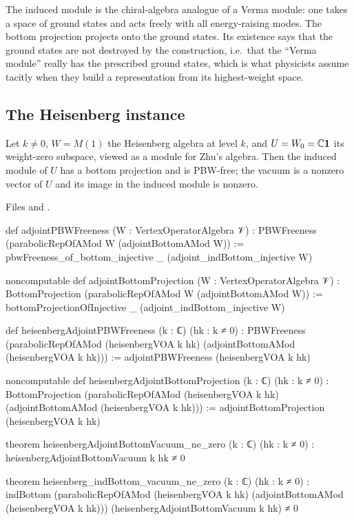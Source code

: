 \begin{physics}
The induced module is the chiral-algebra analogue of a Verma module: one takes a space of ground states and
acts freely with all energy-raising modes. The bottom projection projects onto the ground states.
Its existence says that the ground states are not destroyed by the construction, i.e.\ that the ``Verma
module'' really has the prescribed ground states, which is what physicists assume tacitly when they build a
representation from its highest-weight space.
\end{physics}

\subsection{The Heisenberg instance}

\begin{theorem}\label{l05:thm:pbw}
Let $k\ne0$, $W=M(1)$ the Heisenberg algebra at level $k$, and $U=W_0={\mathbb{C}}\mathbf{1}$ its weight-zero subspace,
viewed as a module for Zhu's algebra. Then the induced module of $U$ has a bottom projection and is PBW-free;
the vacuum is a nonzero vector of $U$ and its image in the induced module is nonzero.
\end{theorem}

\noindent Files  and
.
\begin{leancode}
def adjointPBWFreeness (W : VertexOperatorAlgebra 𝒱) :
    PBWFreeness (parabolicRepOfAMod W (adjointBottomAMod W)) :=
  pbwFreeness_of_bottom_injective _ (adjoint_indBottom_injective W)

noncomputable def adjointBottomProjection (W : VertexOperatorAlgebra 𝒱) :
    BottomProjection (parabolicRepOfAMod W (adjointBottomAMod W)) :=
  bottomProjectionOfInjective _ (adjoint_indBottom_injective W)

def heisenbergAdjointPBWFreeness (k : ℂ) (hk : k ≠ 0) :
    PBWFreeness
      (parabolicRepOfAMod (heisenbergVOA k hk) (adjointBottomAMod (heisenbergVOA k hk))) :=
  adjointPBWFreeness (heisenbergVOA k hk)

noncomputable def heisenbergAdjointBottomProjection (k : ℂ) (hk : k ≠ 0) :
    BottomProjection
      (parabolicRepOfAMod (heisenbergVOA k hk) (adjointBottomAMod (heisenbergVOA k hk))) :=
  adjointBottomProjection (heisenbergVOA k hk)

theorem heisenbergAdjointBottomVacuum_ne_zero (k : ℂ) (hk : k ≠ 0) :
    heisenbergAdjointBottomVacuum k hk ≠ 0

theorem heisenberg_indBottom_vacuum_ne_zero (k : ℂ) (hk : k ≠ 0) :
    indBottom
        (parabolicRepOfAMod (heisenbergVOA k hk) (adjointBottomAMod (heisenbergVOA k hk)))
        (heisenbergAdjointBottomVacuum k hk) ≠ 0
\end{leancode}


